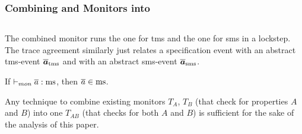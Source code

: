 \documentclass[dvipsnames]{llncs}
\begin{document}
\subsubsection{Combining  and  Monitors into }\label{subsubsec:ms}

\begin{center}
  $\;$\\
\end{center}
The combined monitor runs the one for \gls*{tms} and the one for \gls*{sms} in a lockstep. The trace agreement similarly just relates a specification event with an abstract \gls*{tms}-event $\abstrace[_{\tmssafe}]$ and with an abstract \gls*{sms}-event $\abstrace[_{\smssafe}]$.

\begin{lemma}\label{lem:mon:msafe}
  If $\monmssafe{\trace}$, then $\trace\in\mssafe$.\Coqed
\end{lemma}

Any technique to combine existing monitors $T_A$, $T_B$ (that check for properties $A$ and $B$) into one $T_{AB}$ (that checks for both $A$ and $B$) is sufficient for the sake of the analysis of this paper.
\end{document}
